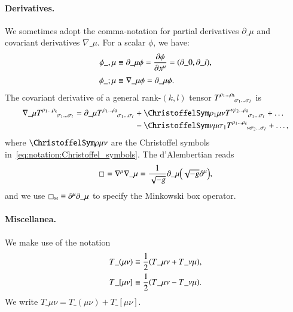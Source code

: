 




\paragraph{Derivatives.} 
We sometimes adopt the comma-notation for partial derivatives $\partial\_\mu$ and covariant derivatives $\nabla\_\mu$. For a scalar $\phi$, we have:
\begin{subequations}\label{eq:notation:comma_notation_darivatives}
    \begin{align}
        \phi\_{,\mu} &\equiv \partial\_\mu \phi = \pdv{\phi}{x\^\mu} =\pclosed{\partial\_0, \partial\_i }, \\
        \phi\_{;\mu} &\equiv \nabla\_\mu \phi = \partial\_\mu \phi . 
    \end{align}
\end{subequations}
The covariant derivative of a general rank-$(k,l)$ tensor $T\iud{\rho_1 \dots \rho_k}{\sigma_1 \dots \sigma_l}$ is
\begin{equation}
    \begin{split}
        \nabla\_\mu T\iud{\rho_1 \dots \rho_k}{\sigma_1 \dots \sigma_l} = \partial\_\mu T\iud{\rho_1 \dots \rho_k}{\sigma_1 \dots \sigma_l} &+ \Chr{\rho_1}{\mu\nu} T\iud{\nu \rho_2 \dots \rho_k}{\sigma_1 \dots \sigma_l} + \dots \\
        &- \Chr{\nu}{\mu\sigma_1} T\iud{\rho_1 \dots \rho_k}{\nu\sigma_2 \dots \sigma_l} + \dots,
    \end{split}
\end{equation}
where $\Chr{\rho}{\mu\nu}$ are the Christoffel symbols in~\cref{eq:notation:Christoffel_symbols}.
The d'Alembertian reads
\begin{equation}\label{eq:notation:dAlembertian}
    \sq   = \nabla\^\mu \nabla\_\mu  = \frac{1}{\sqrt{-g}} \partial\_\mu \pclosed{ \sqrt{-g} \partial\^\mu},
\end{equation}
and we use $\sq\nped{M} \equiv \partial\^\mu\partial\_\mu$ to specify the Minkowski box operator.


\paragraph{Miscellanea.} %
We make use of the notation
\begin{subequations}\label{eq:notation:sym_and_antisym_tensor_notation}
    \begin{align}
        T\_{(\mu\nu)} &\equiv \frac{1}{2} {\left(  T\_{\mu\nu} + T\_{\nu\mu}   \right)}, \\
        T\_{[\mu\nu]} &\equiv \frac{1}{2} {\left(  T\_{\mu\nu} - T\_{\nu\mu}   \right)}.
    \end{align} 
\end{subequations}
We write $T\_{\mu\nu}= T\_{(\mu\nu)} + T\_{[\mu\nu]}$.



